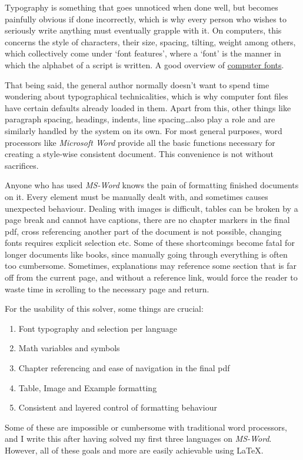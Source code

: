 \documentclass[12pt,twoside]{article}
\begin{document}
Typography is something that goes unnoticed when done well, but becomes painfully obvious if done incorrectly, which is why every person who wishes to seriously write anything must eventually grapple with it. On computers, this concerns the style of characters, their size, spacing, tilting, weight among others, which collectively come under `font features', where a `font' is the manner in which the alphabet of a script is written. A good overview of \href{https://www.youtube.com/watch?v=BfEvIjTQkIE}{computer fonts}.

That being said, the general author normally doesn't want to spend  time wondering about typographical technicalities, which is why computer font files have certain defaults already loaded in them. Apart from this, other things like paragraph spacing, headings, indents, line spacing\ldots also play a role and are similarly handled by the system on its own. For most general purposes, word processors like \textit{Microsoft Word} provide all the basic functions necessary for creating a style-wise consistent document. This convenience is not without sacrifices.

Anyone who has used \textit{MS-Word} knows the pain of formatting finished documents on it. Every element must be manually dealt with, and sometimes causes unexpected behaviour. Dealing with images is difficult, tables can be broken by a page break and cannot have captions, there are no chapter markers in the final pdf, cross referencing another part of the document is not possible, changing fonts requires explicit selection etc. Some of these shortcomings become fatal for longer documents like books, since manually going through everything is often too cumbersome. Sometimes, explanations may reference some section that is far off from the current page, and without a reference link, would force the reader to waste time in scrolling to the necessary page and return.

For the usability of this solver, some things are crucial:
\begin{enumerate}
    \item Font typography and selection per language
    \item Math variables and symbols
    \item Chapter referencing and ease of navigation in the final pdf
    \item Table, Image and Example formatting
    \item Consistent  and layered control of formatting behaviour
\end{enumerate}
Some of these are impossible or cumbersome with  traditional word processors, and I write this after having solved my first three languages on \textit{MS-Word}. However, all of these  goals and more are easily achievable using  \LaTeX.
\end{document}

